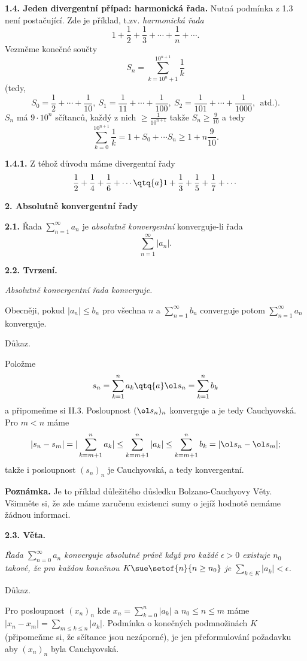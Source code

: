 \documentclass[12pt]{article}
\begin{document}
 \bigskip
 
 {\bf 1.4. Jeden divergentní případ:  harmonická řada.} Nutná podmínka z 1.3 není postačující. Zde je příklad, t.zv. {\em harmonická řada}
 $$
 1+\frac12+\frac13+\cdots+\frac1n+\cdots .
 $$
 Vezměme konečné součty
 $$
 S_n=\sum_{k=10^n+1}^{10^{n+1}}\frac1k
 $$
 (tedy,
 $$
 S_0=\frac12+\cdots+\frac1{10},\ S_1=\frac1{11}+\cdots+\frac1{100},\ S_2=\frac1{101}+\cdots+\frac1{1000}, \ \ \text{atd.}).
 $$ 
 $S_n$ má $9\cdot10^{n}$ sčítanců, každý z nich $\geq \frac1{10^{n+1}}$ takže $S_n\geq \frac9{10}$ a tedy
 $$
 \sum_{k=0}^{10^{n+1}}\frac1k= 1+S_0+\cdots S_n\geq1+n\frac9{10}.
 $$
 
 \medskip
 
 {\bf 1.4.1.} Z téhož důvodu máme divergentní řady
 $$
 \frac12+\frac14+\frac16+\cdots\qtq{a} 1+\frac13+\frac15+\frac17+\cdots
 $$
 
 
 \vskip10mm
 
  {\large\bf 2. Absolutně konvergentní řady}
 
 \bigskip
 
 {\bf 2.1.} Řada $\sum_{n=1}^\infty a_n$ je {\em absolutně konvergentní} konverguje-li  řada
 $$
 \sum_{n=1}^\infty|a_n|.
 $$

 
 \bigskip
 
 {\bf 2.2. Tvrzení.} {\em Absolutně konvergentní řada konverguje.
 
Obecněji, pokud $|a_n|\leq b_n$ pro všechna $n$ a  $\sum_{n=1}^\infty b_n$
 converguje potom $\sum_{n=1}^\infty a_n$ konverguje.
 
 Důkaz.} Položme
 $$
 s_n=\sum_{k=1}^n a_k\qtq{a} \ol s_n=\sum_{k=1}^n b_k
 $$
 a připomeňme si II.3. Posloupnost $(\ol s_n)_n$ konverguje a je tedy Cauchyovská. Pro $m< n$ máme
 $$
 |s_n-s_m|=|\sum_{k=m+1}^n a_k|\leq \sum_{k=m+1}^n |a_k|\leq \sum_{k=m+1}^n b_k=|\ol s_n-\ol s_m|;
 $$
takže i posloupnost $(s_n)_n$ je Cauchyovská, a  tedy konvergentní. \sq
 
 \medskip
 
 {\bf Poznámka.}  Je to příklad důležitého důsledku Bolzano-Cauchyovy Věty. Všimněte si, že zde máme zaručenu existenci sumy o jejíž hodnotě nemáme žádnou informaci.
 
 \bigskip
 
 {\bf 2.3. Věta.} {\em Řada $\sum_{n=0}^\infty a_n$ konverguje absolutně právě když pro každé $\epsilon>0$ existuje  $n_0$ takové, že
pro každou konečnou $K\sue \setof{n}{n\geq n_0}$ je $\sum_{k\in K}|a_k|<\epsilon$.
 
 Důkaz.} Pro posloupnost $(x_n)_n$ kde $x_n=\sum_{k=0}^n |a_k|$ a $n_0\leq n\leq m$ máme $|x_n-x_m|=\sum_{m\leq k\leq n}|a_k|$. Podmínka o konečných podmnožinách $K$ (připomeňme si, že sčítance jsou nezáporné), je jen přeformulování požadavku aby $(x_n)_n$ byla Cauchyovská. \sq
 
\end{document}
